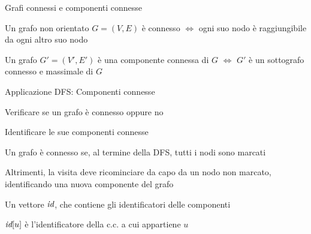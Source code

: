 \begin{frame}{Grafi connessi e componenti connesse}

\vspace{-9pt}
\begin{myboxtitle}[Definizioni]
\BIL
\item Un grafo non orientato $G=(V,E)$ è \alert{connesso} $\Leftrightarrow$ ogni
suo nodo è raggiungibile da ogni altro suo nodo
\item Un grafo $G'=(V',E')$ è una \alert{componente connessa} di $G$ $\Leftrightarrow$ $G'$ è un sottografo connesso e massimale di $G$
\EIL

\end{myboxtitle}


\end{frame}

\begin{frame}{Applicazione DFS: Componenti connesse}

\vspace{-9pt}
\begin{myboxtitle}[Problema]
\BI
\item Verificare se un grafo è connesso oppure no
\item Identificare le sue componenti connesse
\EI
\end{myboxtitle}

\pause
\begin{myboxtitle}[Soluzione]
\BI
\item Un grafo è connesso se, al termine della DFS, tutti i nodi sono marcati
\item Altrimenti, la visita deve ricominciare da capo da un nodo non marcato, identificando una nuova componente del grafo
\EI
\end{myboxtitle}

\begin{myboxtitle}
\BI
\item Un vettore $\textit{id}$, che contiene gli identificatori delle componenti
\item $\textit{id}[u]$ è l'identificatore della c.c. a cui appartiene $u$
\EI
\end{myboxtitle}

\end{frame}



